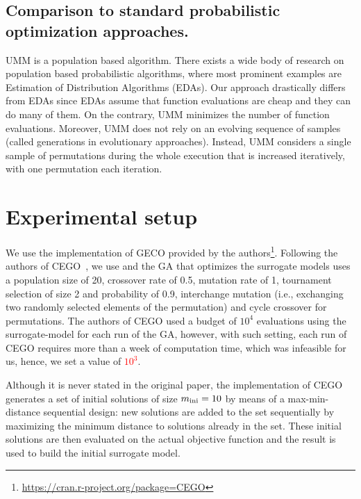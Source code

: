 \documentclass[runningheads]{llncs}
\begin{document}
\subsection{Comparison to standard probabilistic optimization approaches.}
UMM is a population based algorithm. There exists a wide body of research on population based probabilistic algorithms, where most prominent examples are Estimation of Distribution Algorithms (EDAs). Our approach drastically differs from EDAs since EDAs assume that function evaluations are cheap and they can do many of them. On the contrary, UMM minimizes the number of function evaluations. Moreover, UMM does not rely on an evolving sequence of samples (called generations in evolutionary approaches). Instead, UMM considers a single sample of permutations during the whole execution that is increased iteratively, with one permutation each iteration. 








\section{Experimental setup}

We use the implementation of GECO provided by the
authors\footnote{\url{https://cran.r-project.org/package=CEGO}}. Following the
authors of CEGO~\citep{ZaeStoFriFisNauBar2014,ZaeStoBar2014:ppsn}, we use and
the GA that optimizes the surrogate models uses a population size of 20,
crossover rate of 0.5, mutation rate of 1, tournament selection of size 2 and
probability of 0.9, interchange mutation (i.e., exchanging two randomly
selected elements of the permutation) and cycle crossover for permutations. The
authors of CEGO used a budget of $10^4$ evaluations using the surrogate-model
for each run of the GA, however, with such setting, each run of CEGO requires
more than a week of computation time, which was infeasible for us, hence, we
set a value of \textcolor{red}{$10^3$}.

Although it is never stated in the original paper, the implementation of CEGO
generates a set of initial solutions of size $m_\text{ini}=10$ by means of a
max-min-distance sequential design: new solutions are added to the set
sequentially by maximizing the minimum distance to solutions already in the
set. These initial solutions are then evaluated on the actual objective
function and the result is used to build the initial surrogate
model.%
\end{document}
